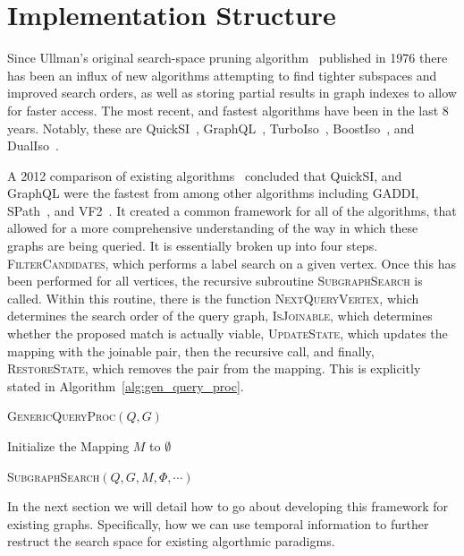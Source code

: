 \section{Implementation Structure}

Since Ullman's original search-space pruning algorithm~\cite{1976-ACMJ-Ullman}
published in 1976 there has been an influx of new algorithms attempting to find
tighter subspaces and improved search orders, as well as storing partial results
in graph indexes to allow for faster access.  The most recent, and fastest
algorithms have been in the last 8 years. Notably, these are
QuickSI~\cite{2008-VLDB-QuickSI}, GraphQL~\cite{2008-SIGMOD-GraphQL},
TurboIso~\cite{2013-SIGMOD-TurboISO}, BoostIso~\cite{2015-VLDB-BoostIso}, and
DualIso~\cite{2014-IEEE-DualIso}.

A 2012 comparison of existing algorithms~\cite{2012-VLDB-IsoSurvey} concluded
that QuickSI, and GraphQL were the fastest from among other algorithms including
GADDI, SPath~\cite{2010-VLDB-SPath}, and VF2~\cite{2004-PAMI-VF2}. It created a
common framework for all of the algorithms, that allowed for a more
comprehensive understanding of the way in which these graphs are being
queried. It is essentially broken up into four steps. \textsc{FilterCandidates},
which performs a label search on a given vertex.  Once this has been performed
for all vertices, the recursive subroutine \textsc{SubgraphSearch} is
called. Within this routine, there is the function \textsc{NextQueryVertex},
which determines the search order of the query graph, \textsc{IsJoinable}, which
determines whether the proposed match is actually viable, \textsc{UpdateState},
which updates the mapping with the joinable pair, then the recursive call, and
finally, \textsc{RestoreState}, which removes the pair from the mapping. This is
explicitly stated in Algorithm~\ref{alg:gen_query_proc}.

\begin{algorithm}
  \label{alg:gen_query_proc}
  \caption{\textsc{GenericQueryProc}$(Q,G)$}
  \SetAlgoLined

  Initialize the Mapping $M$ to $\emptyset$\;

  \textsc{SubgraphSearch}$(Q,G,M,\Phi, \cdots)$\;

  \setcounter{AlgoLine}{0}
\end{algorithm}

In the next section we will detail how to go about developing this framework for
existing graphs. Specifically, how we can use temporal information to further
restruct the search space for existing algorthmic paradigms.



